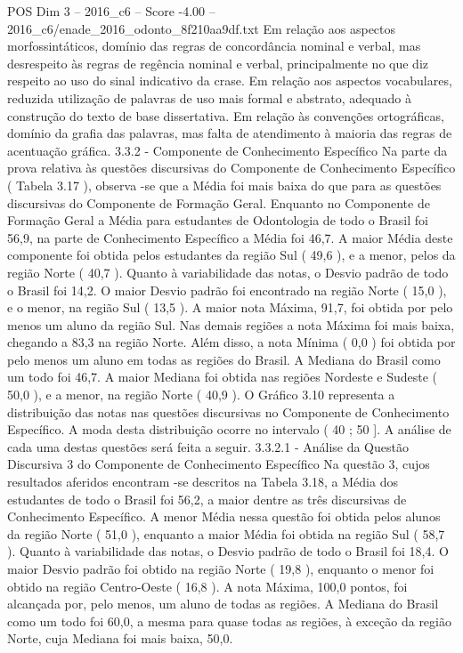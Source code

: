 \begin{textsample}{POS Dim 3 – 2016\_c6 – Score -4.00 – 2016\_c6/enade\_2016\_odonto\_8f210aa9df.txt}
Em relação aos aspectos morfossintáticos, domínio das regras de concordância nominal e verbal, mas desrespeito às regras de regência nominal e verbal, principalmente no que diz respeito ao uso do sinal indicativo da crase.
Em relação aos aspectos vocabulares, reduzida utilização de palavras de uso mais formal e abstrato, adequado à construção do texto de base dissertativa.
Em relação às convenções ortográficas, domínio da grafia das palavras, mas falta de atendimento à maioria das regras de acentuação gráfica. 3.3.2 - Componente de Conhecimento Específico Na parte da prova relativa às questões discursivas do Componente de Conhecimento Específico ( Tabela 3.17 ), observa -se que a Média foi mais baixa do que para as questões discursivas do Componente de Formação Geral.
Enquanto no Componente de Formação Geral a Média para estudantes de Odontologia de todo o Brasil foi 56,9, na parte de Conhecimento Específico a Média foi 46,7.
A maior Média deste componente foi obtida pelos estudantes da região Sul ( 49,6 ), e a menor, pelos da região Norte ( 40,7 ).
Quanto à variabilidade das notas, o Desvio padrão de todo o Brasil foi 14,2.
O maior Desvio padrão foi encontrado na região Norte ( 15,0 ), e o menor, na região Sul ( 13,5 ).
A maior nota Máxima, 91,7, foi obtida por pelo menos um aluno da região Sul.
Nas demais regiões a nota Máxima foi mais baixa, chegando a 83,3 na região Norte.
Além disso, a nota Mínima ( 0,0 ) foi obtida por pelo menos um aluno em todas as regiões do Brasil.
A Mediana do Brasil como um todo foi 46,7.
A maior Mediana foi obtida nas regiões Nordeste e Sudeste ( 50,0 ), e a menor, na região Norte ( 40,9 ).
O Gráfico 3.10 representa a distribuição das notas nas questões discursivas no Componente de Conhecimento Específico.
A moda desta distribuição ocorre no intervalo ( 40 ; 50 ].
A análise de cada uma destas questões será feita a seguir. 3.3.2.1 - Análise da Questão Discursiva 3 do Componente de Conhecimento Específico Na questão 3, cujos resultados aferidos encontram -se descritos na Tabela 3.18, a Média dos estudantes de todo o Brasil foi 56,2, a maior dentre as três discursivas de Conhecimento Específico.
A menor Média nessa questão foi obtida pelos alunos da região Norte ( 51,0 ), enquanto a maior Média foi obtida na região Sul ( 58,7 ).
Quanto à variabilidade das notas, o Desvio padrão de todo o Brasil foi 18,4.
O maior Desvio padrão foi obtido na região Norte ( 19,8 ), enquanto o menor foi obtido na região Centro-Oeste ( 16,8 ).
A nota Máxima, 100,0 pontos, foi alcançada por, pelo menos, um aluno de todas as regiões.
A Mediana do Brasil como um todo foi 60,0, a mesma para quase todas as regiões, à exceção da região Norte, cuja Mediana foi mais baixa, 50,0.

\end{textsample}
